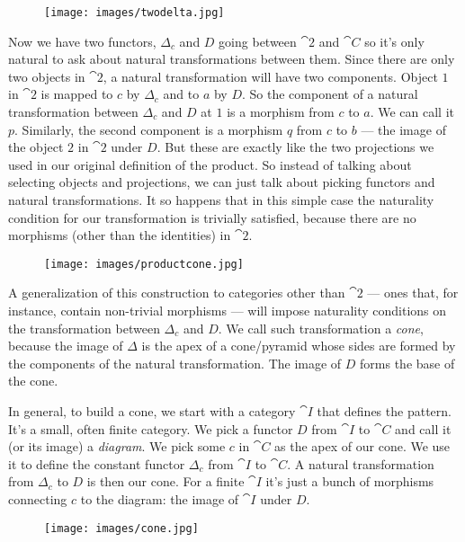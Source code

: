 \begin{figure}[H]
\centering
\texttt{[image: images/twodelta.jpg]}
\end{figure}

\noindent
Now we have two functors, $\Delta_c$ and $D$ going between
$\cat{2}$ and $\cat{C}$ so it's only natural to ask about natural
transformations between them. Since there are only two objects in
$\cat{2}$, a natural transformation will have two components. Object $1$
in $\cat{2}$ is mapped to $c$ by $\Delta_c$ and to
$a$ by $D$. So the component of a natural transformation between
$\Delta_c$ and $D$ at $1$ is a morphism from $c$ to
$a$. We can call it $p$. Similarly, the second component
is a morphism $q$ from $c$ to $b$ --- the image of
the object $2$ in $\cat{2}$ under $D$. But these are exactly like the two
projections we used in our original definition of the product. So
instead of talking about selecting objects and projections, we can just
talk about picking functors and natural transformations. It so happens
that in this simple case the naturality condition for our transformation
is trivially satisfied, because there are no morphisms (other than the
identities) in $\cat{2}$.

\begin{figure}[H]
\centering
\texttt{[image: images/productcone.jpg]}
\end{figure}

\noindent
A generalization of this construction to categories other than
$\cat{2}$ --- ones that, for instance, contain non-trivial morphisms
--- will impose naturality conditions on the transformation between
$\Delta_c$ and $D$. We call such transformation a \emph{cone},
because the image of $\Delta$ is the apex of a cone/pyramid whose sides are
formed by the components of the natural transformation. The image of $D$
forms the base of the cone.

In general, to build a cone, we start with a category $\cat{I}$ that
defines the pattern. It's a small, often finite category. We pick a
functor $D$ from $\cat{I}$ to $\cat{C}$ and call it (or its image) a
\emph{diagram}. We pick some $c$ in $\cat{C}$ as the apex of our
cone. We use it to define the constant functor $\Delta_c$ from
$\cat{I}$ to $\cat{C}$. A natural transformation from $\Delta_c$
to $D$ is then our cone. For a finite $\cat{I}$ it's just a bunch of
morphisms connecting $c$ to the diagram: the image of $\cat{I}$
under $D$.

\begin{figure}[H]
\centering
\texttt{[image: images/cone.jpg]}
\end{figure}

